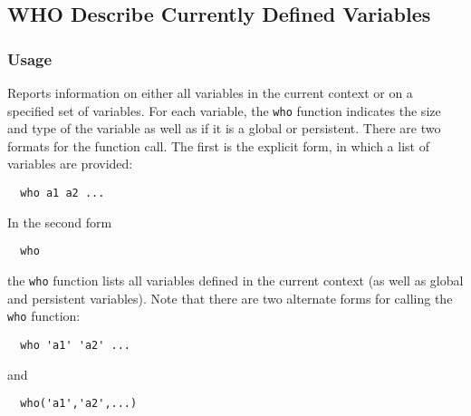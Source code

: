 %
%
%
\subsection{WHO Describe Currently Defined Variables}
\subsubsection{Usage}
Reports information on either all variables in the current context
or on a specified set of variables.  For each variable, the \verb|who|
function indicates the size and type of the variable as well as 
if it is a global or persistent.  There are two formats for the 
function call.  The first is the explicit form, in which a list
of variables are provided:
\begin{verbatim}
  who a1 a2 ...
\end{verbatim}
In the second form
\begin{verbatim}
  who
\end{verbatim}
the \verb|who| function lists all variables defined in the current 
context (as well as global and persistent variables). Note that
there are two alternate forms for calling the \verb|who| function:
\begin{verbatim}
  who 'a1' 'a2' ...
\end{verbatim}
and
\begin{verbatim}
  who('a1','a2',...)
\end{verbatim}
